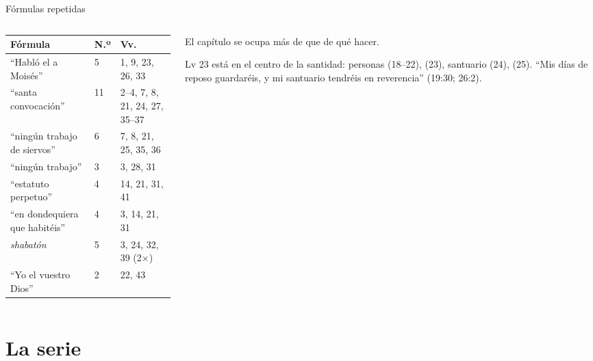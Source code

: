 \begin{frame}{Fórmulas repetidas}
\begin{columns}[c,onlytextwidth]
\begin{column}{0.60\textwidth}
\scriptsize\renewcommand{\arraystretch}{1.06}
\begin{tabular}{@{}L{3.6cm}L{0.6cm}L{2.6cm}@{}}
\toprule
\textbf{Fórmula} & \textbf{N.º} & \textbf{Vv.} \\ \midrule
``Habló el \SENOR{} a Moisés'' & 5 & 1, 9, 23, 26, 33 \\
``santa convocación'' & 11 & 2--4, 7, 8, 21, 24, 27, 35--37 \\
``ningún trabajo de siervos'' & 6 & 7, 8, 21, 25, 35, 36 \\
``ningún trabajo'' & 3 & 3, 28, 31 \\
``estatuto perpetuo'' & 4 & 14, 21, 31, 41 \\
``en dondequiera que habitéis'' & 4 & 3, 14, 21, 31 \\
\emph{shabatón} & 5 & 3, 24, 32, 39 (2×) \\
``Yo el \SENOR{} vuestro Dios'' & 2 & 22, 43 \\
\bottomrule
\end{tabular}\par
{}
\end{column}
\begin{column}{0.38\textwidth}\small
El capítulo se ocupa más de  que de qué hacer.\par\medskip
\scriptsize Lv 23 está en el centro de la santidad: personas (18--22),  (23), santuario (24),  (25). ``Mis días de reposo guardaréis, y mi santuario tendréis en reverencia'' (19:30; 26:2).
\end{column}
\end{columns}
\end{frame}

\section{La serie}

